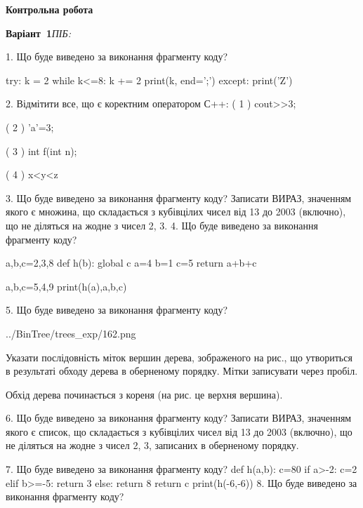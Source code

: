 \documentclass[11pt]{article}
\begin{document}
{\large\textbf{Контрольна робота}}

\textbf{Варіант \No\,1}\hfill \textit{ПІБ:}\,\underline{\hspace{60mm}}
\vspace{4mm}

1. Що буде виведено за виконання фрагменту коду?

try:
    k = 2
    while k<=8:
        k += 2
    print(k, end=';')
except:
    print('Z')


2. %
Відмітити все, що є коректним оператором С++:
( 1 ) cout>>3;

( 2 ) 'a'=3;

( 3 ) int f(int n);

( 4 ) x<y<z

3. Що буде виведено за виконання фрагменту коду?
Записати ВИРАЗ, значенням якого є множина, що складається з кубівцілих чисел від 13 до 2003 (включно), що не діляться на жодне з чисел 2, 3.
4. Що буде виведено за виконання фрагменту коду?

a,b,c=2,3,8
def h(b):
global c    a=4
    b=1
    c=5
    return a+b+c

a,b,c=5,4,9
print(h(a),a,b,c)

5. Що буде виведено за виконання фрагменту коду?

\begin{center}
	{../BinTree/trees_exp/162.png}
\end{center}
Указати послідовність міток вершин дерева, зображеного на рис., що утвориться в результаті обходу дерева в оберненому порядку. Мітки записувати через пробіл.\par Обхід дерева починається з кореня (на рис. це верхня вершина).

6. Що буде виведено за виконання фрагменту коду?
Записати ВИРАЗ, значенням якого є список, що складається з кубівцілих чисел від 13 до 2003 (включно), що не діляться на жодне з чисел 2, 3, записаних в обернено\-му порядку.

7. Що буде виведено за виконання фрагменту коду?
def h(a,b):
      c=80
      if a>-2: c=2
      elif b>=-5: return 3
      else: return 8
      return c
   print(h(-6,-6))
8. Що буде виведено за виконання фрагменту коду?
\end{document}
